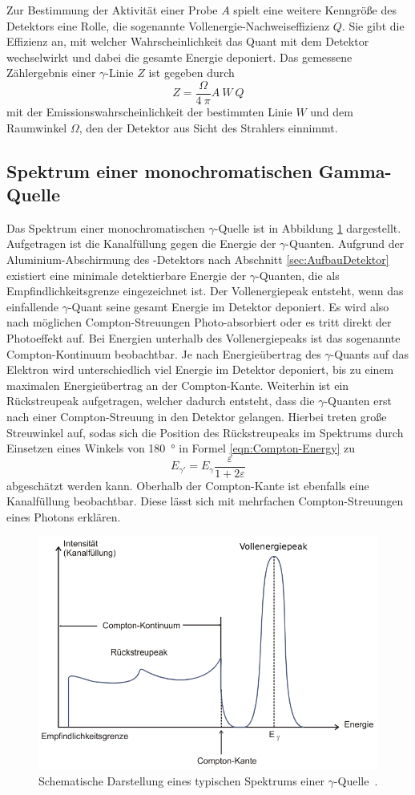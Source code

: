 Zur Bestimmung der Aktivität einer Probe $A$ spielt eine weitere Kenngröße des Detektors eine
Rolle, die sogenannte Vollenergie-Nachweiseffizienz $Q$.
Sie gibt die Effizienz an, mit welcher Wahrscheinlichkeit das Quant mit dem Detektor
wechselwirkt und dabei die gesamte Energie deponiert.
Das gemessene Zählergebnis einer $\gamma$-Linie $Z$ ist gegeben durch
\begin{equation}
	Z = \frac{\Omega}{4\:\pi} A\:W\:Q
	\label{eqn:Vollenergie-Nachweiseffizienz}
\end{equation}
mit der Emissionswahrscheinlichkeit der bestimmten Linie $W$
und dem Raumwinkel $\Omega$, den der Detektor aus Sicht des Strahlers einnimmt.

\subsection{Spektrum einer monochromatischen Gamma-Quelle}
\label{sec:TypischeQuelle}

Das Spektrum einer monochromatischen $\gamma$-Quelle ist in Abbildung \ref{fig:typisches-Spektrum}
dargestellt. Aufgetragen ist die Kanalfüllung gegen die Energie der $\gamma$-Quanten.
Aufgrund der Aluminium-Abschirmung des -Detektors nach Abschnitt \ref{sec:AufbauDetektor} existiert eine
minimale detektierbare Energie der $\gamma$-Quanten, die als Empfindlichkeitsgrenze eingezeichnet ist.
Der Vollenergiepeak entsteht, wenn das einfallende $\gamma$-Quant seine gesamt Energie im Detektor
deponiert. Es wird also nach möglichen Compton-Streuungen Photo-absorbiert
oder es tritt direkt der Photoeffekt auf.
Bei Energien unterhalb des Vollenergiepeaks ist das sogenannte Compton-Kontinuum beobachtbar. Je nach
Energieübertrag des $\gamma$-Quants auf das Elektron wird unterschiedlich viel Energie im Detektor deponiert,
bis zu einem maximalen Energieübertrag an der Compton-Kante.
Weiterhin ist ein Rückstreupeak aufgetragen, welcher dadurch entsteht, dass die $\gamma$-Quanten erst
nach einer Compton-Streuung in den Detektor gelangen.
Hierbei treten große Streuwinkel auf, sodas sich die Position des Rückstreupeaks im
Spektrums durch Einsetzen eines Winkels von \SI{180}{\degree} in Formel
\eqref{eqn:Compton-Energy} zu
\begin{equation}
  E_{\gamma'} = E_\gamma \frac{\varepsilon}{1 + 2 \varepsilon}
\end{equation}
abgeschätzt werden kann.
Oberhalb der Compton-Kante ist ebenfalls eine Kanalfüllung beobachtbar. Diese lässt sich mit mehrfachen
Compton-Streuungen eines Photons erklären.

\begin{figure}
	\centering
	\includegraphics[width=.8\textwidth]{images/typisches-Spektrum.pdf}
	\caption{Schematische Darstellung eines typischen Spektrums einer $\gamma$-Quelle~\cite[23]{anleitung}.}
	\label{fig:typisches-Spektrum}
\end{figure}
